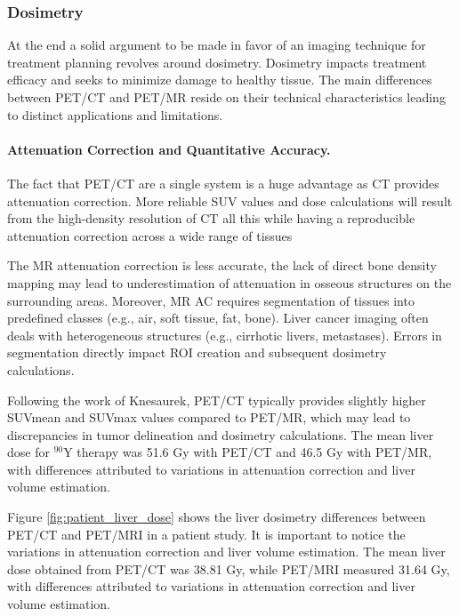 
\subsubsection*{Dosimetry}
At the end a solid argument to be made in favor of an imaging technique for treatment planning revolves around dosimetry. Dosimetry impacts treatment efficacy and seeks to minimize damage to healthy tissue. The main differences between PET/CT and PET/MR reside on their technical characteristics leading to distinct applications and limitations.

\paragraph{Attenuation Correction and Quantitative Accuracy.}

The fact that PET/CT are a single system is a huge advantage as CT provides attenuation correction. More reliable SUV values and dose calculations will result from the high-density resolution of CT all this while having a reproducible attenuation correction across a wide range of tissues

The MR attenuation correction is less accurate, the lack of direct bone density mapping may lead to underestimation of attenuation in osseous structures on the surrounding areas. Moreover, MR AC requires segmentation of tissues into predefined classes (e.g., air, soft tissue, fat, bone). Liver cancer imaging often deals with heterogeneous structures (e.g., cirrhotic livers, metastases). Errors in segmentation directly impact ROI creation and subsequent dosimetry calculations. 


Following the work of Knesaurek, \cite{knesaurek2018} PET/CT typically provides slightly higher SUVmean and SUVmax values compared to PET/MR, which may lead to discrepancies in tumor delineation and dosimetry calculations. The mean liver dose for $^{90}\text{Y}$ therapy was 51.6 Gy with PET/CT and 46.5 Gy with PET/MR, with differences attributed to variations in attenuation correction and liver volume estimation.

Figure \ref{fig:patient_liver_dose} shows the liver dosimetry differences between PET/CT and PET/MRI in a patient study. It is important to notice the variations in attenuation correction and liver volume estimation. The mean liver dose obtained from PET/CT was 38.81 Gy, while PET/MRI measured 31.64 Gy, with differences attributed to variations in attenuation correction and liver volume estimation.

